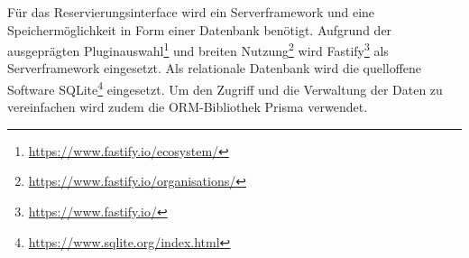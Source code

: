Für das Reservierungsinterface wird ein Serverframework und eine Speichermöglichkeit in Form einer
Datenbank benötigt. Aufgrund der ausgeprägten
Pluginauswahl\footnote{\url{https://www.fastify.io/ecosystem/}} und breiten
Nutzung\footnote{\url{https://www.fastify.io/organisations/}} wird
Fastify\footnote{\url{https://www.fastify.io/}} als Serverframework eingesetzt. Als relationale
Datenbank wird die quelloffene Software SQLite\footnote{\url{https://www.sqlite.org/index.html}}
eingesetzt. Um den Zugriff und die Verwaltung der Daten zu vereinfachen wird zudem die
ORM-Bibliothek Prisma verwendet.


